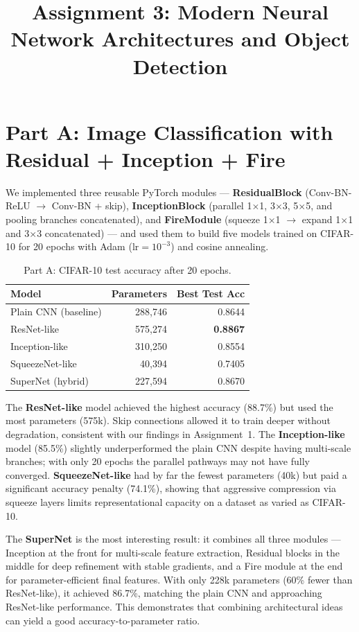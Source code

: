 \documentclass[11pt,a4paper]{article}
\title{Assignment 3: Modern Neural Network Architectures and Object Detection}
\author{}
\date{}
\begin{document}
\maketitle
\vspace{-1.5cm}

\section{Part A: Image Classification with Residual + Inception + Fire}

We implemented three reusable PyTorch modules --- \textbf{ResidualBlock} (Conv-BN-ReLU $\to$ Conv-BN + skip), \textbf{InceptionBlock} (parallel 1$\times$1, 3$\times$3, 5$\times$5, and pooling branches concatenated), and \textbf{FireModule} (squeeze 1$\times$1 $\to$ expand 1$\times$1 and 3$\times$3 concatenated) --- and used them to build five models trained on CIFAR-10 for 20 epochs with Adam ($\text{lr}=10^{-3}$) and cosine annealing.

\begin{table}[H]
\centering
\begin{tabular}{lrr}
\toprule
Model & Parameters & Best Test Acc \\
\midrule
Plain CNN (baseline) & 288,746 & 0.8644 \\
ResNet-like & 575,274 & \textbf{0.8867} \\
Inception-like & 310,250 & 0.8554 \\
SqueezeNet-like & 40,394 & 0.7405 \\
SuperNet (hybrid) & 227,594 & 0.8670 \\
\bottomrule
\end{tabular}
\caption{Part A: CIFAR-10 test accuracy after 20 epochs.}
\end{table}

The \textbf{ResNet-like} model achieved the highest accuracy (88.7\%) but used the most parameters (575k). Skip connections allowed it to train deeper without degradation, consistent with our findings in Assignment~1. The \textbf{Inception-like} model (85.5\%) slightly underperformed the plain CNN despite having multi-scale branches; with only 20 epochs the parallel pathways may not have fully converged. \textbf{SqueezeNet-like} had by far the fewest parameters (40k) but paid a significant accuracy penalty (74.1\%), showing that aggressive compression via squeeze layers limits representational capacity on a dataset as varied as CIFAR-10.

The \textbf{SuperNet} is the most interesting result: it combines all three modules --- Inception at the front for multi-scale feature extraction, Residual blocks in the middle for deep refinement with stable gradients, and a Fire module at the end for parameter-efficient final features. With only 228k parameters (60\% fewer than ResNet-like), it achieved 86.7\%, matching the plain CNN and approaching ResNet-like performance. This demonstrates that combining architectural ideas can yield a good accuracy-to-parameter ratio.
\end{document}
